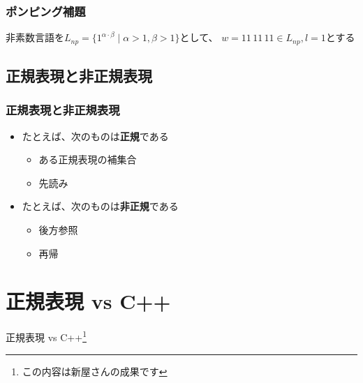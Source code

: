 \documentclass[12pt, unicode, svgnames]{beamer}
\begin{document}
\begin{frame}
  \frametitle{ポンピング補題}

  非素数言語を$L_{np} = \{1^{\alpha \cdot \beta} \mid \alpha > 1, \beta > 1\}$として、
  $w = 11\, 11\, 11 \in L_{np}, l = 1$とする

\end{frame}

\subsection{正規表現と非正規表現}
\begin{frame}[fragile]
  \frametitle{正規表現と非正規表現}

  \begin{itemize}
    \item<2->  たとえば、次のものは\textbf{正規}である
      \begin{itemize}
        \item ある正規表現の補集合
        \item 先読み
      \end{itemize}
    \item<3-> たとえば、次のものは\textbf{非正規}である
      \begin{itemize}
        \item 後方参照
        \item 再帰
      \end{itemize}
  \end{itemize}
\end{frame}


\section{正規表現 vs C++}
\begin{frame}
  \centering
  {\Huge 正規表現 vs C++\footnote[frame]{この内容は新屋さんの成果です}}
\end{frame}
\end{document}
